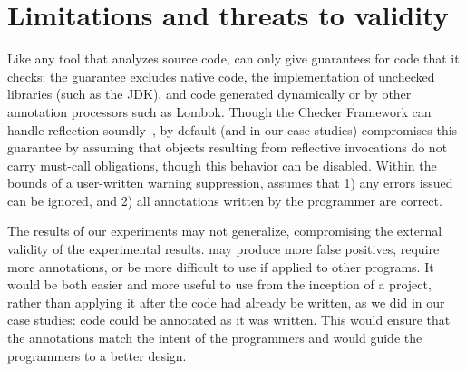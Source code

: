 \section{Limitations and threats to validity}
\label{sec:threats}

Like any tool that analyzes source code, \Tool can only
give guarantees for code that it checks: the guarantee
excludes native code, the implementation of unchecked libraries (such as the JDK),
and code generated dynamically or by other annotation processors
such as Lombok. Though
the Checker Framework can handle 
reflection soundly~\cite{BarrosJMVDdAE2015}, by default (and in our case studies)
\Tool compromises this guarantee
by assuming that objects resulting from reflective invocations
do not carry must-call obligations, though this behavior can
be disabled.
Within the bounds
of a user-written warning suppression, \Tool assumes that 1)
any errors issued can be ignored, and 2) all annotations
written by the programmer are correct.

The results of our experiments may not generalize, compromising the
external validity of the experimental results.
\Tool may produce more false positives, require
more annotations, or be more difficult to use if applied to other
programs.  It would be both easier and more useful to use \Tool from
the inception of a project, rather than applying it after the code had
already be written, as we did in our case studies: code could be
annotated as it was written.  This would ensure that the annotations match
the intent of the programmers and would guide the programmers to a better design.

